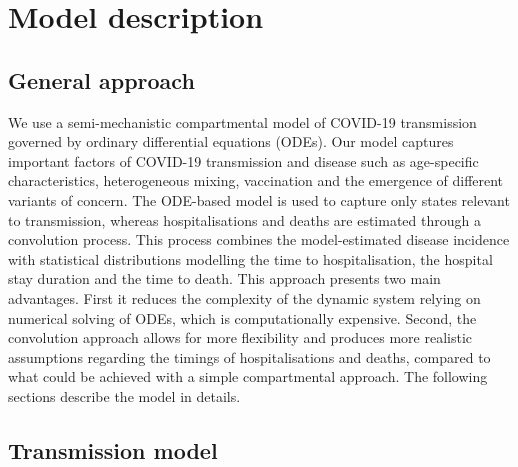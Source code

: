 
\section{Model description}

\subsection{General approach}
We use a semi-mechanistic compartmental model of COVID-19 transmission governed by ordinary differential equations (ODEs). 
Our model captures important factors of COVID-19 transmission and disease such as age-specific characteristics, 
heterogeneous mixing, vaccination and the emergence of different variants of concern. 
The ODE-based model is used to capture only states relevant to transmission, whereas hospitalisations and deaths are
estimated through a convolution process. This process combines the model-estimated disease incidence with 
statistical distributions modelling the time to hospitalisation, the hospital stay duration and the time to death.
This approach presents two main advantages. First it reduces the complexity of the dynamic system relying on 
numerical solving of ODEs, which is computationally expensive. Second, the convolution approach allows for more flexibility 
and produces more realistic assumptions regarding the timings of hospitalisations and deaths, 
compared to what could be achieved with a simple compartmental approach. The following sections describe the model in details.


\subsection{Transmission model}
\label{trans}
